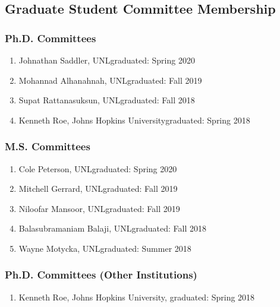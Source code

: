 \documentclass[11pt]{article}
\begin{document}
{  \subsection{Graduate Student Committee Membership}
  \subsubsection{Ph.D. Committees}
  \begin{enumerate}
  \item Johnathan Saddler, UNL\hfill graduated: Spring 2020
  \item Mohannad Alhanahnah, UNL\hfill graduated: Fall 2019
  \item Supat Rattanasuksun, UNL\hfill graduated: Fall 2018
  \item Kenneth Roe,  Johns Hopkins University\hfill graduated: Spring 2018
  \end{enumerate}

  \subsubsection{M.S. Committees}
  \label{sec:orgf0f85e7}
  \begin{enumerate}
  \item Cole Peterson, UNL\hfill graduated: Spring 2020
  \item Mitchell Gerrard, UNL\hfill graduated: Fall 2019
  \item Niloofar Mansoor, UNL\hfill graduated: Fall 2019
  \item Balasubramaniam Balaji, UNL\hfill graduated: Fall 2018
  \item Wayne Motycka, UNL\hfill graduated: Summer 2018
  \end{enumerate}


  \subsubsection{Ph.D. Committees (Other Institutions)}
  \begin{enumerate}
  \item Kenneth Roe,  Johns Hopkins University,  graduated: Spring 2018
  \end{enumerate}

}
\end{document}
